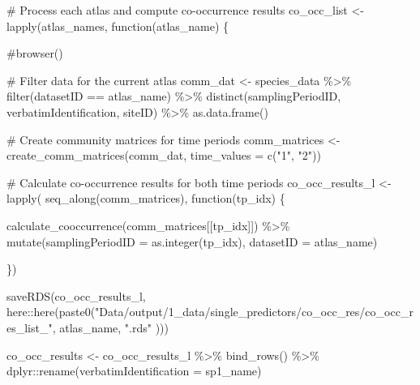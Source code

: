 \documentclass[
  letterpaper,
  DIV=11,
  numbers=noendperiod]{scrreprt}
\newenvironment{Shaded}{\begin{snugshade}}{\end{snugshade}}
\newcommand{\AttributeTok}[1]{\textcolor[rgb]{0.40,0.45,0.13}{#1}}
\newcommand{\CommentTok}[1]{\textcolor[rgb]{0.37,0.37,0.37}{#1}}
\newcommand{\ControlFlowTok}[1]{\textcolor[rgb]{0.00,0.23,0.31}{#1}}
\newcommand{\FunctionTok}[1]{\textcolor[rgb]{0.28,0.35,0.67}{#1}}
\newcommand{\NormalTok}[1]{\textcolor[rgb]{0.00,0.23,0.31}{#1}}
\newcommand{\OtherTok}[1]{\textcolor[rgb]{0.00,0.23,0.31}{#1}}
\newcommand{\SpecialCharTok}[1]{\textcolor[rgb]{0.37,0.37,0.37}{#1}}
\newcommand{\StringTok}[1]{\textcolor[rgb]{0.13,0.47,0.30}{#1}}
\begin{document}
\begin{Shaded}
\begin{Highlighting}[]
  \CommentTok{\# Process each atlas and compute co{-}occurrence results}
\NormalTok{  co\_occ\_list }\OtherTok{\textless{}{-}} \FunctionTok{lapply}\NormalTok{(atlas\_names, }\ControlFlowTok{function}\NormalTok{(atlas\_name) \{}

    \CommentTok{\#browser()}

    \CommentTok{\# Filter data for the current atlas}
\NormalTok{    comm\_dat }\OtherTok{\textless{}{-}}\NormalTok{ species\_data }\SpecialCharTok{\%\textgreater{}\%}
      \FunctionTok{filter}\NormalTok{(datasetID }\SpecialCharTok{==}\NormalTok{ atlas\_name) }\SpecialCharTok{\%\textgreater{}\%}
      \FunctionTok{distinct}\NormalTok{(samplingPeriodID, verbatimIdentification, siteID) }\SpecialCharTok{\%\textgreater{}\%}
      \FunctionTok{as.data.frame}\NormalTok{()}

    \CommentTok{\# Create community matrices for time periods}
\NormalTok{    comm\_matrices }\OtherTok{\textless{}{-}} \FunctionTok{create\_comm\_matrices}\NormalTok{(comm\_dat, }\AttributeTok{time\_values =} \FunctionTok{c}\NormalTok{(}\StringTok{"1"}\NormalTok{, }\StringTok{"2"}\NormalTok{))}

    \CommentTok{\# Calculate co{-}occurrence results for both time periods}
\NormalTok{    co\_occ\_results\_l }\OtherTok{\textless{}{-}} \FunctionTok{lapply}\NormalTok{(}
      \FunctionTok{seq\_along}\NormalTok{(comm\_matrices), }\ControlFlowTok{function}\NormalTok{(tp\_idx) \{}

        \FunctionTok{calculate\_cooccurrence}\NormalTok{(comm\_matrices[[tp\_idx]]) }\SpecialCharTok{\%\textgreater{}\%}
          \FunctionTok{mutate}\NormalTok{(}\AttributeTok{samplingPeriodID =} \FunctionTok{as.integer}\NormalTok{(tp\_idx),}
                 \AttributeTok{datasetID =}\NormalTok{ atlas\_name)}

\NormalTok{      \}) }

    \FunctionTok{saveRDS}\NormalTok{(co\_occ\_results\_l, here}\SpecialCharTok{::}\FunctionTok{here}\NormalTok{(}\FunctionTok{paste0}\NormalTok{(}\StringTok{"Data/output/1\_data/single\_predictors/co\_occ\_res/co\_occ\_res\_list\_"}\NormalTok{, atlas\_name, }\StringTok{".rds"}\NormalTok{ )))}

\NormalTok{    co\_occ\_results }\OtherTok{\textless{}{-}}\NormalTok{ co\_occ\_results\_l }\SpecialCharTok{\%\textgreater{}\%}
      \FunctionTok{bind\_rows}\NormalTok{() }\SpecialCharTok{\%\textgreater{}\%}
\NormalTok{      dplyr}\SpecialCharTok{::}\FunctionTok{rename}\NormalTok{(}\AttributeTok{verbatimIdentification =}\NormalTok{ sp1\_name) }


\end{Highlighting}
\end{Shaded}
\end{document}
